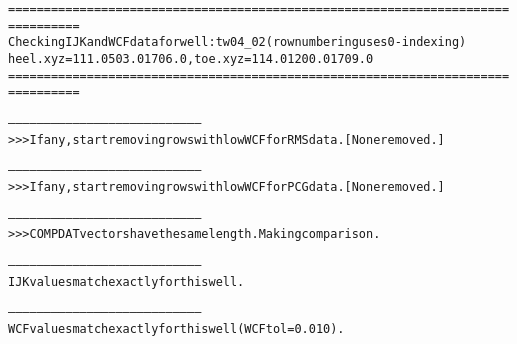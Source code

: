 \begin{alltt}
================================================================================
Checking IJK and WCF data for well: tw04_02 (row numbering uses 0-indexing)
heel.xyz = 111.0 503.0 1706.0, toe.xyz = 114.0 1200.0 1709.0
================================================================================

--------------------------------------------------------------------------------
>>> If any, start removing rows with low WCF for RMS data. [None removed.]

--------------------------------------------------------------------------------
>>> If any, start removing rows with low WCF for PCG data. [None removed.]

--------------------------------------------------------------------------------
>>> COMPDAT vectors have the same length. Making comparison.

--------------------------------------------------------------------------------
IJK values match exactly for this well.

--------------------------------------------------------------------------------
WCF values match exactly for this well (WCF tol = 0.010).
\end{alltt}
